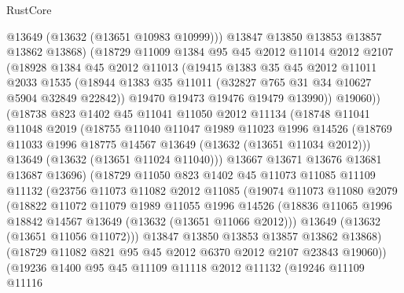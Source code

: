\begin{lexlean}{RustCore}
\begin{coremodule}
              @13649
              (@13632 (@13651 @10983 @10999)))
            @13847
            @13850
            @13853
            @13857
            @13862
            @13868)
          (@18729
            @11009
            @1384
            @95
            @45
            @2012
            @11014
            @2012
            @2107
            (@18928
              @1384
              @45
              @2012
              @11013
              (@19415
                @1383
                @35
                @45
                @2012
                @11011
                @2033
                @1535
                (@18944 @1383 @35 @11011 (@32827 @765 @31 @34 @10627 @5904 @32849 @22842))
                @19470
                @19473
                @19476
                @19479
                @13990))
            @19060))
        (@18738
          @823
          @1402
          @45
          @11041
          @11050
          @2012
          @11134
          (@18748
            @11041
            @11048
            @2019
            (@18755
              @11040
              @11047
              @1989
              @11023
              @1996
              @14526
              (@18769 @11033 @1996 @18775 @14567 @13649 (@13632 (@13651 @11034 @2012)))
              @13649
              (@13632 (@13651 @11024 @11040)))
            @13667
            @13671
            @13676
            @13681
            @13687
            @13696)
          (@18729
            @11050
            @823
            @1402
            @45
            @11073
            @11085
            @11109
            @11132
            (@23756
              @11073
              @11082
              @2012
              @11085
              (@19074
                @11073
                @11080
                @2079
                (@18822
                  @11072
                  @11079
                  @1989
                  @11055
                  @1996
                  @14526
                  (@18836 @11065 @1996 @18842 @14567 @13649 (@13632 (@13651 @11066 @2012)))
                  @13649
                  (@13632 (@13651 @11056 @11072)))
                @13847
                @13850
                @13853
                @13857
                @13862
                @13868)
              (@18729 @11082 @821 @95 @45 @2012 @6370 @2012 @2107 @23843 @19060))
            (@19236
              @1400
              @95
              @45
              @11109
              @11118
              @2012
              @11132
              (@19246
                @11109
                @11116

\end{coremodule}
\end{lexlean}
